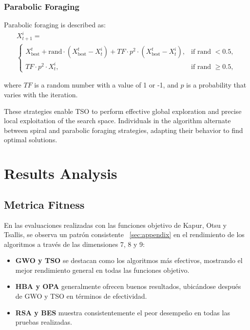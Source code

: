 \documentclass{elsarticle}
\begin{document}
\subsubsection{Parabolic Foraging}
Parabolic foraging is described as:
\begin{equation}
    \begin{gathered}
        X_{t+1}^i = \\
        \begin{cases}
            X_{\text{best}}^t + \text{rand} \cdot (X_{\text{best}}^t - X_t^i) + TF \cdot p^2 \cdot (X_{\text{best}}^t - X_t^i), & \text{if rand } < 0.5,\\
            TF \cdot p^2 \cdot X_t^i, & \text{if rand } \geq 0.5,
        \end{cases}
    \end{gathered}
\end{equation}

\noindent where $TF$ is a random number with a value of 1 or -1, and $p$ is a probability that varies with the iteration.

\noindent These strategies enable TSO to perform effective global exploration and precise local exploitation of the search space. Individuals in the algorithm alternate between spiral and parabolic foraging strategies, adapting their behavior to find optimal solutions.

\section{Results Analysis}
\subsection{Metrica Fitness}
\noindent En las evaluaciones realizadas con las funciones objetivo de Kapur, Otsu y Tsallis, se observa un patrón consistente ~\ref{sec:appendix} en el rendimiento de los algoritmos a través de las dimensiones 7, 8 y 9:
\begin{itemize}
    \item \textbf{GWO y TSO} se destacan como los algoritmos más efectivos, mostrando el mejor rendimiento general en todas las funciones objetivo.
    \item \textbf{HBA y OPA} generalmente ofrecen buenos resultados, ubicándose después de GWO y TSO en términos de efectividad.
    \item \textbf{RSA y BES} muestra consistentemente el peor desempeño en todas las pruebas realizadas.
\end{itemize}
\end{document}
